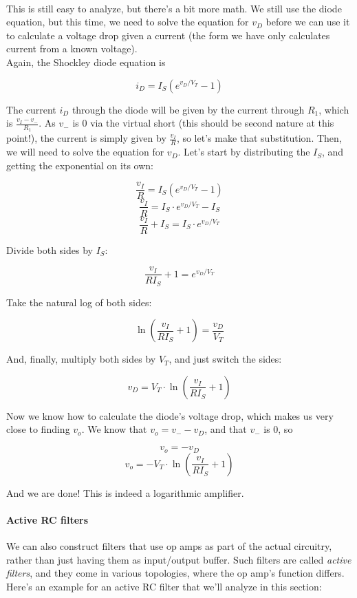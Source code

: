 \ \\
This is still easy to analyze, but there's a bit more math. We still use the diode equation, but this time, we need to solve the equation for $v_D$ before we can use it to calculate a voltage drop given a current (the form we have only calculates current from a known voltage).\\

Again, the Shockley diode equation is

\[ i_D = I_S(e^{v_D/V_T} - 1) \]

The current $i_D$ through the diode will be given by the current through $R_1$, which is $\displaystyle \frac{v_I - v_-}{R_1}$. As $v_-$ is 0 via the virtual short (this should be second nature at this point!), the current is simply given by $\displaystyle \frac{v_I}{R}$, so let's make that substitution. Then,
we will need to solve the equation for $v_D$. Let's start by distributing the $I_S$, and getting the exponential on its own:

\[ \frac{v_I}{R} = I_S(e^{v_D/V_T} - 1) \]
\[ \frac{v_I}{R} = I_S \cdot e^{v_D/V_T} - I_S \]
\[ \frac{v_I}{R} + I_S = I_S \cdot e^{v_D/V_T} \]

Divide both sides by $I_S$:

\[ \frac{v_I}{R I_S} + 1 = e^{v_D/V_T} \]

Take the natural log of both sides:

\[ \ln{(\frac{v_I}{R I_S} + 1)} = \frac{v_D}{V_T} \]

And, finally, multiply both sides by $V_T$, and just switch the sides:

\[ v_D = V_T \cdot \ln{(\frac{v_I}{R I_S} + 1)} \]

Now we know how to calculate the diode's voltage drop, which makes us very close to finding $v_o$. We know that $v_o = v_- - v_D$, and that $v_-$ is 0, so

\[ v_o = -v_D \]
\[ v_o = -V_T \cdot \ln{(\frac{v_I}{R I_S} + 1)} \]

And we are done! This is indeed a logarithmic amplifier.

\paragraph{Active RC filters}
We can also construct filters that use op amps as part of the actual circuitry, rather than just having them as input/output buffer. Such filters are called \emph{active filters}, and they come in various topologies, where the op amp's function differs.\\
Here's an example for an active RC filter that we'll analyze in this section:\\

